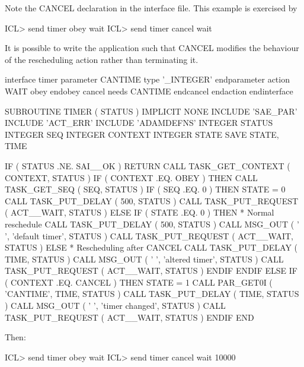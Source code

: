 \documentclass[twoside,11pt,nolof]{starlink}
\begin{document}
Note the CANCEL declaration in the interface file. This example is exercised by

\begin{small}
\begin{terminalv}
ICL> send timer obey wait
ICL> send timer cancel wait
\end{terminalv}
\end{small}

It is possible to write the application such that CANCEL modifies the
behaviour of the rescheduling action rather than terminating it.

\begin{small}
\begin{terminalv}
interface timer
   parameter CANTIME
      type '_INTEGER'
   endparameter
   action WAIT
      obey
      endobey
      cancel needs CANTIME
      endcancel
   endaction
endinterface

      SUBROUTINE TIMER ( STATUS )
      IMPLICIT NONE
      INCLUDE 'SAE_PAR'
      INCLUDE 'ACT_ERR'
      INCLUDE 'ADAMDEFNS'
      INTEGER STATUS
      INTEGER SEQ
      INTEGER CONTEXT
      INTEGER STATE
      SAVE STATE, TIME

      IF ( STATUS .NE. SAI__OK ) RETURN
      CALL TASK_GET_CONTEXT ( CONTEXT, STATUS )
      IF ( CONTEXT .EQ. OBEY ) THEN
         CALL TASK_GET_SEQ ( SEQ, STATUS )
         IF ( SEQ .EQ. 0 ) THEN
            STATE = 0
            CALL TASK_PUT_DELAY ( 500, STATUS )
            CALL TASK_PUT_REQUEST ( ACT__WAIT, STATUS )
         ELSE
            IF ( STATE .EQ. 0 ) THEN
*            Normal reschedule
               CALL TASK_PUT_DELAY ( 500, STATUS )
               CALL MSG_OUT ( ' ', 'default timer', STATUS )
               CALL TASK_PUT_REQUEST ( ACT__WAIT, STATUS )
            ELSE
*            Rescheduling after CANCEL
               CALL TASK_PUT_DELAY ( TIME, STATUS )
               CALL MSG_OUT ( ' ', 'altered timer', STATUS )
               CALL TASK_PUT_REQUEST ( ACT__WAIT, STATUS )
            ENDIF
         ENDIF
      ELSE IF ( CONTEXT .EQ. CANCEL ) THEN
         STATE = 1
         CALL PAR_GET0I ( 'CANTIME', TIME, STATUS )
         CALL TASK_PUT_DELAY ( TIME, STATUS )
         CALL MSG_OUT ( ' ', 'timer changed', STATUS )
         CALL TASK_PUT_REQUEST ( ACT__WAIT, STATUS )
      ENDIF
      END
\end{terminalv}
\end{small}

Then:
\begin{small}
\begin{terminalv}
ICL> send timer obey wait
ICL> send timer cancel wait 10000
\end{terminalv}
\end{small}
\end{document}
